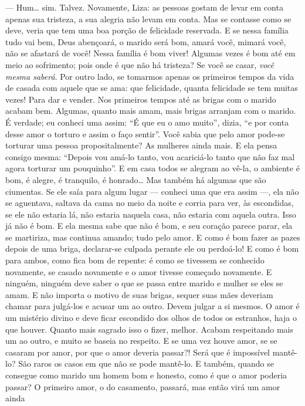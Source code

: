 --- Hum\ldots{} sim. Talvez. Novamente, Liza: as pessoas gostam de levar em
conta apenas sua tristeza, a sua alegria não levam em conta. Mas se
contasse como se deve, veria que tem uma boa porção de felicidade
reservada. E se nessa família tudo vai bem, Deus abençoará, o marido
será bom, amará você, mimará você, não se afastará de você! Nessa
família é bom viver! Algumas vezes é bom até em meio ao sofrimento;
pois onde é que não há tristeza? Se você se casar,
\textit{você mesma saberá}. Por
outro lado, se tomarmos apenas os primeiros tempos da vida de casada
com aquele que se ama: que felicidade, quanta felicidade se tem muitas
vezes! Para dar e vender. Nos primeiros tempos até as brigas com o
marido acabam bem. Algumas, quanto mais amam, mais brigas arranjam com
o marido. É verdade; eu conheci uma assim: “É que eu o amo muito”,
dizia, “e por conta desse amor o torturo e assim o faço sentir”. Você
sabia que pelo amor pode-se torturar uma pessoa propositalmente? As
mulheres ainda mais. E ela pensa consigo mesma: “Depois vou amá-lo
tanto, vou acariciá-lo tanto que não faz mal agora torturar um
pouquinho”. E em casa todos se alegram ao vê-la, o ambiente é bom, é
alegre, é tranquilo, é honrado\ldots{} Mas também há algumas que são
ciumentas. Se ele saía para algum lugar --- conheci uma que era assim ---,
ela não se aguentava, saltava da cama no meio da noite e corria para
ver, às escondidas, se ele não estaria lá, não estaria naquela casa,
não estaria com aquela outra. Isso já não é bom. E ela mesma sabe que
não é bom, e seu coração parece parar, ela se martiriza, mas continua
amando; tudo pelo amor. E como é bom fazer as pazes depois de uma
briga, declarar-se culpada perante ele ou perdoá-lo! E como é bom para
ambos, como fica bom de repente: é como se tivessem se conhecido
novamente, se casado novamente e o amor tivesse começado novamente. E
ninguém, ninguém deve saber o que se passa entre marido e mulher se
eles se amam. E não importa o motivo de suas brigas, sequer suas mães
deveriam chamar para julgá-los e acusar um ao outro. Devem julgar a si
mesmos. O amor é um mistério divino e deve ficar escondido dos olhos de
todos os estranhos, haja o que houver. Quanto mais sagrado isso o
fizer, melhor. Acabam respeitando mais um ao outro, e muito se baseia
no respeito. E se uma vez houve amor, se se casaram por amor, por que o
amor deveria passar?! Será que é impossível mantê-lo? São raros os
casos em que não se pode mantê-lo. E também, quando se consegue como
marido um homem bom e honesto, como é que o amor poderia passar? O
primeiro amor, o do casamento, passará, mas então virá um amor ainda
